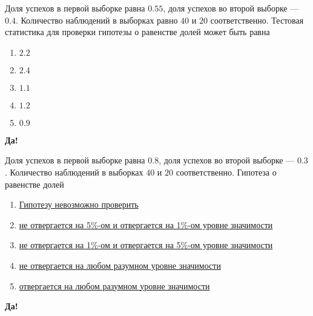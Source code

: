 \documentclass[t]{beamer}
\begin{document}
 \begin{frame} \label{9-Yes} 
\begin{block}{9} 

  Доля успехов в первой выборке равна $0.55$, доля успехов во второй выборке — $0.4$. Количество наблюдений в выборках равно $40$ и $20$ соответственно. Тестовая статистика для проверки гипотезы о равенстве долей может быть равна
  


 \end{block} 
\begin{enumerate} 
\item[] \hyperlink{9-No}{\beamergotobutton{} $2.2$}
\item[] \hyperlink{9-No}{\beamergotobutton{} $2.4$}
\item[] \hyperlink{9-Yes}{\beamergotobutton{} $1.1$}
\item[] \hyperlink{9-No}{\beamergotobutton{} $1.2$}
\item[] \hyperlink{9-No}{\beamergotobutton{} $0.9$}
\end{enumerate} 

 \textbf{Да!} 
 \hyperlink{10}{}\end{frame} 


 \begin{frame} \label{10-Yes} 
\begin{block}{10} 

  Доля успехов в первой выборке равна $0.8$, доля успехов во второй выборке — $0.3$. Количество наблюдений в выборках $40$ и $20$ соответственно. Гипотеза о равенстве долей
  


 \end{block} 
\begin{enumerate} 
\item[] \hyperlink{10-No}{\beamergotobutton{} Гипотезу невозможно проверить}
\item[] \hyperlink{10-No}{\beamergotobutton{} не отвергается на 5\%-ом и отвергается на 1\%-ом уровне значимости}
\item[] \hyperlink{10-No}{\beamergotobutton{} не отвергается на 1\%-ом и отвергается на 5\%-ом уровне значимости}
\item[] \hyperlink{10-No}{\beamergotobutton{} не отвергается на любом разумном уровне значимости}
\item[] \hyperlink{10-Yes}{\beamergotobutton{} отвергается на любом разумном уровне значимости}
\end{enumerate} 

 \textbf{Да!} 
 \hyperlink{11}{}\end{frame} 
\end{document}
